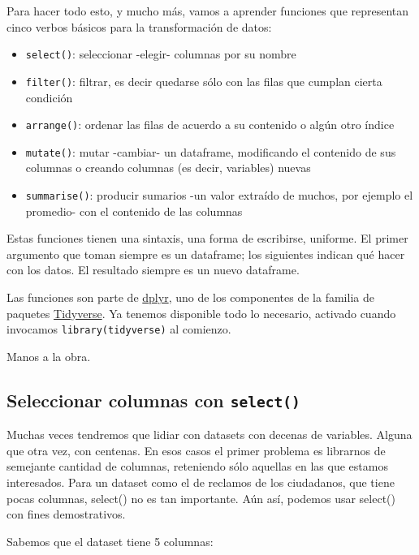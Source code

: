 \documentclass[spanish,]{book}
\providecommand{\tightlist}{%
  \setlength{\itemsep}{0pt}\setlength{\parskip}{0pt}}
\begin{document}
Para hacer todo esto, y mucho más, vamos a aprender funciones que representan cinco verbos básicos para la transformación de datos:

\begin{itemize}
\tightlist
\item
  \texttt{select()}: seleccionar -elegir- columnas por su nombre
\item
  \texttt{filter()}: filtrar, es decir quedarse sólo con las filas que cumplan cierta condición
\item
  \texttt{arrange()}: ordenar las filas de acuerdo a su contenido o algún otro índice
\item
  \texttt{mutate()}: mutar -cambiar- un dataframe, modificando el contenido de sus columnas o creando columnas (es decir, variables) nuevas
\item
  \texttt{summarise()}: producir sumarios -un valor extraído de muchos, por ejemplo el promedio- con el contenido de las columnas
\end{itemize}

Estas funciones tienen una sintaxis, una forma de escribirse, uniforme. El primer argumento que toman siempre es un dataframe; los siguientes indican qué hacer con los datos. El resultado siempre es un nuevo dataframe.

Las funciones son parte de \href{http://dplyr.tidyverse.org/}{dplyr}, uno de los componentes de la familia de paquetes \href{https://www.tidyverse.org/}{Tidyverse}. Ya tenemos disponible todo lo necesario, activado cuando invocamos \texttt{library(tidyverse)} al comienzo.

Manos a la obra.

\hypertarget{seleccionar-columnas-con-select}{%
\subsection{\texorpdfstring{Seleccionar columnas con \texttt{select()}}{Seleccionar columnas con select()}}\label{seleccionar-columnas-con-select}}

Muchas veces tendremos que lidiar con datasets con decenas de variables. Alguna que otra vez, con centenas. En esos casos el primer problema es librarnos de semejante cantidad de columnas, reteniendo sólo aquellas en las que estamos interesados. Para un dataset como el de reclamos de los ciudadanos, que tiene pocas columnas, select() no es tan importante. Aún así, podemos usar select() con fines demostrativos.

Sabemos que el dataset tiene 5 columnas:
\end{document}
